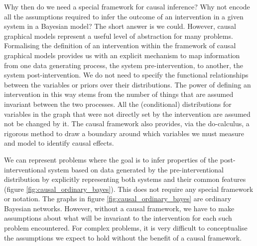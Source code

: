 \documentclass[11pt,a4paper,twoside]{report}
\theoremstyle{plain}
\theoremstyle{definition}
\begin{document}
Why then do we need a special framework for causal inference? Why not encode all the assumptions required to infer the outcome of an intervention in a given system in a Bayesian model? The short answer is we could. However, causal graphical models represent a useful level of abstraction for many problems. Formalising the definition of an intervention within the framework of causal graphical models provides us with an explicit mechanism to map information from one data generating process, the system pre-intervention, to another, the system post-intervention. We do not need to specify the functional relationships between the variables or priors over their distributions. The power of defining an intervention in this way stems from the number of things that are assumed invariant between the two processes. All the (conditional) distributions for variables in the graph that were not directly set by the intervention are assumed not be changed by it. The causal framework also provides, via the do-calculus, a rigorous method to draw a boundary around which variables we must measure and model to identify causal effects.  

We can represent problems where the goal is to infer properties of the post-interventional system based on data generated by the pre-interventional distribution by explicitly representing both systems and their common features (figure \ref{fig:causal_ordinary_bayes}). This does not require any special framework or notation. The graphs in figure  \ref{fig:causal_ordinary_bayes} are ordinary Bayesian networks. However, without a causal framework, we have to make assumptions about what will be invariant to the intervention for each such problem encountered. For complex problems, it is very difficult to conceptualise the assumptions we expect to hold without the benefit of a causal framework.  
\end{document}
